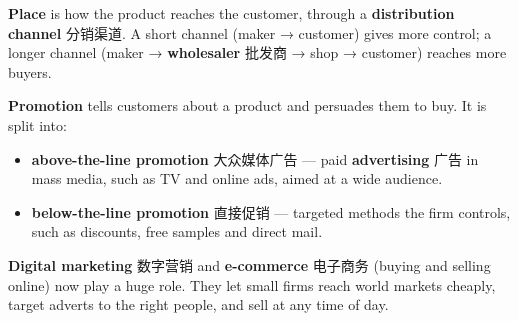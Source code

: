 \documentclass[11pt]{article}
\begin{document}
\textbf{Place} is how the product reaches the customer, through a \textbf{distribution channel} 分销渠道. A short channel (maker → customer) gives more control; a longer channel (maker → \textbf{wholesaler} 批发商 → shop → customer) reaches more buyers.

\textbf{Promotion} tells customers about a product and persuades them to buy. It is split into:

\begin{itemize}
\item \textbf{above-the-line promotion} 大众媒体广告 — paid \textbf{advertising} 广告 in mass media, such as TV and online ads, aimed at a wide audience.

\item \textbf{below-the-line promotion} 直接促销 — targeted methods the firm controls, such as discounts, free samples and direct mail.

\end{itemize}

\textbf{Digital marketing} 数字营销 and \textbf{e-commerce} 电子商务 (buying and selling online) now play a huge role. They let small firms reach world markets cheaply, target adverts to the right people, and sell at any time of day.
\end{document}
